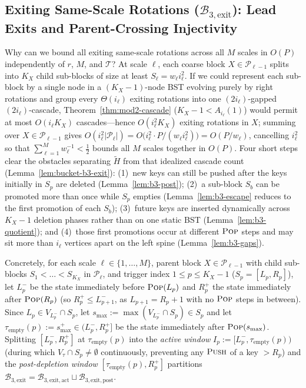 \documentclass[11pt]{article}
\theoremstyle{definition}
\theoremstyle{remark}
\newcommand{\PUSH}{\textnormal{\scshape Push}}
\newcommand{\POP}{\textnormal{\scshape Pop}}
\begin{document}
\subsection{Exiting Same-Scale Rotations (\texorpdfstring{$\mathcal{B}_{3,\mathrm{exit}}$}{B3-exit}): Lead Exits and Parent-Crossing Injectivity}
\label{subsec:b3-exit}

Why can we bound all exiting same-scale rotations across all $M$ scales in $O(P)$ independently of $r$, $M$, and $\mathcal{T}$? At scale $\ell$, each coarse block $X \in \mathcal{P}_{\ell-1}$ splits into $K_X$ child sub-blocks of size at least $S_\ell = w_\ell i_\ell^2$. If we could represent each sub-block by a single node in a $(K_X - 1)$-node BST evolving purely by right rotations and group every $\Theta(i_\ell)$ exiting rotations into one $(2 i_\ell)$-gapped $(2 i_\ell)$-cascade, Theorem~\ref{thm:mod2-cascade} ($K_X - 1 < A_{i_\ell}(1)$) would permit at most $O(i_\ell K_X)$ cascades---hence $O(i_\ell^2 K_X)$ exiting rotations in $X$; summing over $X \in \mathcal{P}_{\ell-1}$ gives $O(i_\ell^2 |\mathcal{P}_\ell|) = O\big(i_\ell^2 \cdot P / (w_\ell i_\ell^2)\big) = O(P / w_\ell)$, cancelling $i_\ell^2$ so that $\sum_{\ell=1}^M w_\ell^{-1} < \frac{1}{2}$ bounds all $M$ scales together in $O(P)$. Four short steps clear the obstacles separating $\widetilde{H}$ from that idealized cascade count (Lemma~\ref{lem:bucket-b3-exit}): (1)~new keys can still be pushed after the keys initially in $S_p$ are deleted (Lemma~\ref{lem:b3-post}); (2)~a sub-block $S_b$ can be promoted more than once while $S_p$ empties (Lemma~\ref{lem:b3-escape} reduces to the first promotion of each $S_b$); (3)~future keys are inserted dynamically across $K_X - 1$ deletion phases rather than on one static BST (Lemma~\ref{lem:b3-quotient}); and (4)~those first promotions occur at different $\POP$ steps and may sit more than $i_\ell$ vertices apart on the left spine (Lemma~\ref{lem:b3-gaps}).

Concretely, for each scale $\ell \in \{1, \dots, M\}$, parent block $X \in \mathcal{P}_{\ell-1}$ with child sub-blocks $S_1 < \dots < S_{K_X}$ in $\mathcal{P}_\ell$, and trigger index $1 \le p \le K_X - 1$ ($S_p = [L_p, R_p]$), let $L_p^-$ be the state immediately before $\POP(L_p)$ and $R_p^+$ the state immediately after $\POP(R_p)$ (so $R_p^+ \le L_{p+1}^-$, as $L_{p+1} = R_p + 1$ with no $\POP$ steps in between). Since $L_p \in V_{L_p^-} \cap S_p$, let $s_{\max} := \max(V_{L_p^-} \cap S_p) \in S_p$ and let $\tau_{\mathrm{empty}}(p) := s_{\max}^+ \in (L_p^-, R_p^+]$ be the state immediately after $\POP(s_{\max})$. Splitting $[L_p^-, R_p^+]$ at $\tau_{\mathrm{empty}}(p)$ into the \emph{active window} $I_p := [L_p^-, \tau_{\mathrm{empty}}(p))$ (during which $V_\tau \cap S_p \ne \emptyset$ continuously, preventing any $\PUSH$ of a key $> R_p$) and the \emph{post-depletion window} $[\tau_{\mathrm{empty}}(p), R_p^+]$ partitions $\mathcal{B}_{3,\mathrm{exit}} = \mathcal{B}_{3,\mathrm{exit,act}} \sqcup \mathcal{B}_{3,\mathrm{exit,post}}$.
\end{document}
